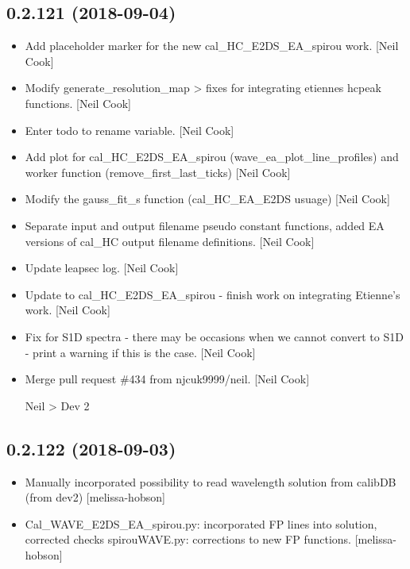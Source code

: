 \documentclass[a4paper,10pt,english]{report}
\begin{document}
\subsection{0.2.121 (2018-09-04)}
\label{\detokenize{misc/changelog:id339}}\begin{itemize}
\item {} 
Add placeholder marker for the new cal\_HC\_E2DS\_EA\_spirou work. {[}Neil
Cook{]}

\item {} 
Modify generate\_resolution\_map \textendash{}\textgreater{} fixes for integrating etiennes
hcpeak functions. {[}Neil Cook{]}

\item {} 
Enter todo to rename variable. {[}Neil Cook{]}

\item {} 
Add plot for cal\_HC\_E2DS\_EA\_spirou (wave\_ea\_plot\_line\_profiles) and
worker function (remove\_first\_last\_ticks) {[}Neil Cook{]}

\item {} 
Modify the gauss\_fit\_s function (cal\_HC\_EA\_E2DS usuage) {[}Neil Cook{]}

\item {} 
Separate input and output filename pseudo constant functions, added EA
versions of cal\_HC output filename definitions. {[}Neil Cook{]}

\item {} 
Update leapsec log. {[}Neil Cook{]}

\item {} 
Update to cal\_HC\_E2DS\_EA\_spirou - finish work on integrating Etienne’s
work. {[}Neil Cook{]}

\item {} 
Fix for S1D spectra - there may be occasions when we cannot convert to
S1D - print a warning if this is the case. {[}Neil Cook{]}

\item {} 
Merge pull request \#434 from njcuk9999/neil. {[}Neil Cook{]}

Neil \textendash{}\textgreater{} Dev 2

\end{itemize}


\subsection{0.2.122 (2018-09-03)}
\label{\detokenize{misc/changelog:id340}}\begin{itemize}
\item {} 
Manually incorporated possibility to read wavelength solution from
calibDB (from dev2) {[}melissa-hobson{]}

\item {} 
Cal\_WAVE\_E2DS\_EA\_spirou.py: incorporated FP lines into solution,
corrected checks spirouWAVE.py: corrections to new FP functions.
{[}melissa-hobson{]}

\end{itemize}
\end{document}
